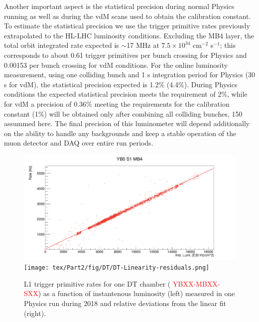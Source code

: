 Another important aspect is the statistical precision during normal Physics running as well as during the vdM scans used to obtain the calibration constant.
To estimate the statistical precision we use the trigger primitive rates previously extrapolated to the HL-LHC luminosity conditions.
Excluding the MB4 layer, the total orbit integrated rate expected is $\sim$17 MHz at $7.5\times10^{34}$ cm$^{-2}$ s$^{-1}$;
this corresponds to about 0.61 trigger primitives per bunch crossing for Physics and 0.00153 per bunch crossing for vdM conditions.    
For the online luminosity measurement, using one colliding bunch and 1 s integration period for Physics (30 s for vdM),
the statistical precision expected is 1.2\% (4.4\%).
During Physics conditions the expected statistical precision meets the requirement of 2\%,
while for vdM a precision of 0.36\%  meeting the requirements for the calibration constant (1\%) will be obtained only after combining all colliding bunches, 150 assummed here.
The final precision of this luminometer will depend additionally on the ability to handle any backgrounds and keep a stable operation of the muon detector and DAQ over entire run periods.




\begin{figure}[hbtp]
\centering
\includegraphics[width=.49\linewidth]{tex/Part2/fig/DT/DT-Linearity.png}
\texttt{[image: tex/Part2/fig/DT/DT-Linearity-residuals.png]}
\caption{L1 trigger primitive rates for one DT chamber ( \textcolor{red}{YBXX-MBXX-SXX}) as a function of instantenous luminosity (left) measured in one Physics run during 2018
and relative deviations from the linear fit (right).} 
\label{fig:DT_linearity}
\end{figure}


